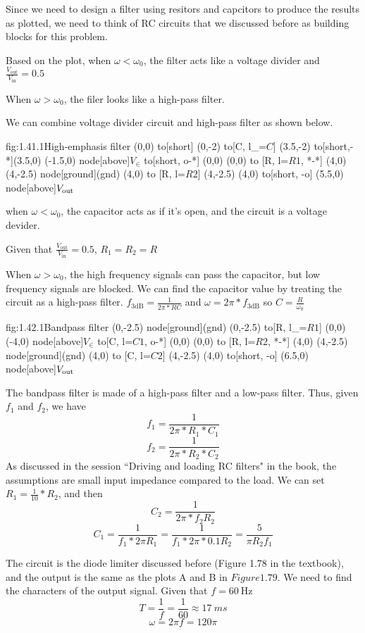 Since we need to design a filter using resitors and capcitors to produce the results as plotted, we need to think of RC circuits that we discussed before as building blocks for this problem.

Based on the plot, when $\omega < \omega_0$, the filter acts like a voltage divider and $\frac{V_\text{out}}{V_\text{in}} = 0.5$

When $\omega > \omega_0$, the filer looks like a high-pass filter. 

We can combine voltage divider circuit and high-pass filter as shown below. 
\begin{circuit}{fig:1.41.1}{High-emphasis filter}
    (0,0) to[short] (0,-2)
    to[C, l_=$C$] (3.5,-2)
    to[short,-*](3.5,0)
    (-1.5,0) node[above]{$V_\in$} to[short, o-*] (0,0)
    (0,0) to [R, l=$R1$, *-*] (4,0)
    (4,-2.5) node[ground](gnd){}
    (4,0) to [R, l=$R2$] (4,-2.5)
    (4,0) to[short, -o] (5.5,0) node[above]{$V_{\text{out}}$}
\end{circuit}
when $\omega < \omega_0$, the capacitor acts as if it's open, and the circuit is a voltage devider. 

Given that $\frac{V_\text{out}}{V_\text{in}} = 0.5$, $R_1 = R_2 = R$

When $\omega > \omega_0$, the high frequency signals can pass the capacitor, but low frequency signals are blocked. 
We can find the capacitor value by treating the circuit as a high-pass filter. 
$f_\text{3dB} = \frac{1}{2\pi*RC}$ and $\omega = 2\pi*f_\text{3dB}$ so $C = \frac{R}{\omega_0}$


\begin{circuit}{fig:1.42.1}{Bandpass filter}
    (0,-2.5) node[ground](gnd){}
    (0,-2.5) to[R, l_=$R1$] (0,0)
    (-4,0) node[above]{$V_\in$} to[C, l=$C1$, o-*] (0,0)
    (0,0) to [R, l=$R2$, *-*] (4,0)
    (4,-2.5) node[ground](gnd){}
    (4,0) to [C, l=$C2$] (4,-2.5)
    (4,0) to[short, -o] (6.5,0) node[above]{$V_{\text{out}}$}
\end{circuit}
The bandpass filter is made of a high-pass filter and a low-pass filter. Thus, given $f_1$ and $f_2$, we have
\[f_1 = \frac{1}{2\pi*R_1*C_1}\]
\[f_2 = \frac{1}{2\pi*R_2*C_2}\]
As discussed in the session ``Driving and loading RC filters" in the book, the assumptions are small input impedance compared to the load.
We can set $R_1 = \frac{1}{10} * R_2$, and then
\[C_2 = \frac{1}{2\pi * f_2 R_2 }\]
\[C_1=\frac{1}{f_1*2\pi R_1} = \frac{1}{f_1*2\pi * 0.1R_2} = \frac{5}{\pi R_2 f_1}\]

The circuit is the diode limiter discussed before (Figure 1.78 in the textbook), and the output is the same as the plots A and B in $Figure 1.79$.
We need to find the characters of the output signal. 
Given that $f=\SI{60}{\Hz}$
\[T = \frac{1}{f} = \frac{1}{60} \approx \SI{17}{ms}\]
\[\omega = 2 \pi f = 120 \pi\]


